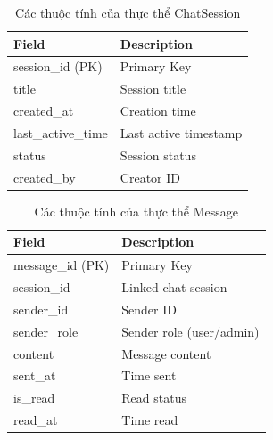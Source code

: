 \begin{table}[H]
\centering
\begin{tabular}{|p{4.5cm}|p{6cm}|}
\hline
\textbf{Field} & \textbf{Description} \\ \hline
session\_id (PK) & Primary Key \\ \hline
title & Session title \\ \hline
created\_at & Creation time \\ \hline
last\_active\_time & Last active timestamp \\ \hline
status & Session status \\ \hline
created\_by & Creator ID \\ \hline
\end{tabular}
\vspace{15pt}
\caption{Các thuộc tính của thực thể ChatSession}
\end{table}

\begin{table}[H]
\centering
\begin{tabular}{|p{4.5cm}|p{6cm}|}
\hline
\textbf{Field} & \textbf{Description} \\ \hline
message\_id (PK) & Primary Key \\ \hline
session\_id & Linked chat session \\ \hline
sender\_id & Sender ID \\ \hline
sender\_role & Sender role (user/admin) \\ \hline
content & Message content \\ \hline
sent\_at & Time sent \\ \hline
is\_read & Read status \\ \hline
read\_at & Time read \\ \hline
\end{tabular}
\vspace{15pt}
\caption{Các thuộc tính của thực thể Message}
\end{table}
